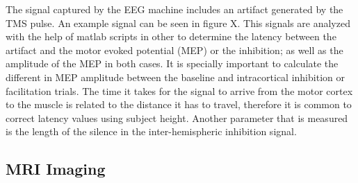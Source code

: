 The signal captured by the EEG machine includes an artifact generated by the TMS pulse. An example signal can be seen in figure X. This signals are analyzed with the help of matlab scripts in other to determine the latency between the artifact and the motor evoked potential (MEP) or the inhibition; as well as the amplitude of the MEP in both cases. It is specially important to calculate the different in MEP amplitude between the baseline and intracortical inhibition or facilitation trials. The time it takes for the signal to arrive from the motor cortex to the muscle is related to the distance it has to travel, therefore it is common to correct latency values using subject height. Another parameter that is measured is the length of the silence in the inter-hemispheric inhibition signal.


\subsection{MRI Imaging}



